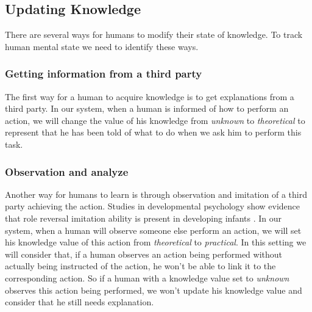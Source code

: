 \documentclass{llncs}
\begin{document}
\subsection{Updating Knowledge}

There are several ways for humans to modify their state of knowledge. To track human mental state we need to identify these ways.

\subsubsection{Getting information from a third party}
The first way for a human to acquire knowledge is to get explanations from a third party. In our system, when a human is informed of how to perform an action, we will change the value of his knowledge from \textit{unknown} to \textit{theoretical} to represent that he has been told of what to do when we ask him to perform this task.

\subsubsection{Observation and analyze}
%
Another way for humans to learn is through observation and imitation of a third party achieving the action. Studies in developmental psychology show evidence that role reversal imitation ability is present in developing infants \cite{carpenter2005}.
In our system, when a human will observe someone else perform an action, we will set his knowledge value of this action from \textit{theoretical} to \textit{practical}. In this setting we will consider that, if a human observes an action being performed without actually being instructed of the action, he won't be able to link it to the corresponding action. So if a human with a knowledge value set to \textit{unknown} observes this action being performed, we won't update his knowledge value and consider that he still needs explanation.
\end{document}
